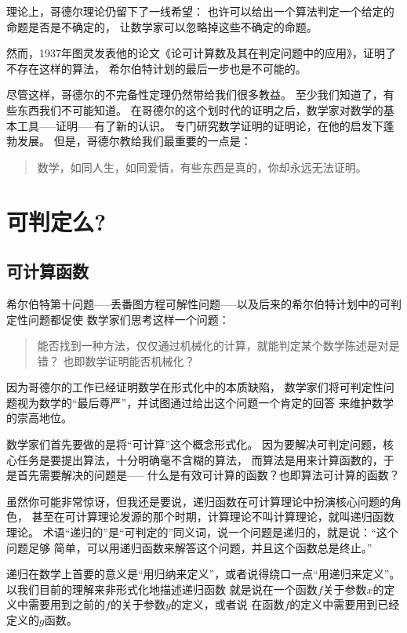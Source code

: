 \documentclass[12pt,a4paper,oneside]{ctexrep}
\theoremstyle{definition}
\begin{document}
理论上，哥德尔理论仍留下了一线希望：
也许可以给出一个算法判定一个给定的命题是否是不确定的，
让数学家可以忽略掉这些不确定的命题。

然而，1937年图灵发表他的论文《论可计算数及其在判定问题中的应用》，证明了不存在这样的算法，
希尔伯特计划的最后一步也是不可能的。

尽管这样，哥德尔的不完备性定理仍然带给我们很多教益。
至少我们知道了，有些东西我们不可能知道。
在哥德尔的这个划时代的证明之后，数学家对数学的基本工具-----证明-----有了新的认识。
专门研究数学证明的证明论，在他的启发下蓬勃发展。
但是，哥德尔教给我们最重要的一点是\cite{dream}：

\begin{quote}
数学，如同人生，如同爱情，有些东西是真的，你却永远无法证明。
\end{quote}

\section{可判定么?}

\subsection{可计算函数}

希尔伯特第十问题-----丢番图方程可解性问题-----以及后来的希尔伯特计划中的可判定性问题都促使
数学家们思考这样一个问题：

\begin{quote}
能否找到一种方法，仅仅通过机械化的计算，就能判定某个数学陈述是对是错？
也即数学证明能否机械化？
\end{quote}

因为哥德尔的工作已经证明数学在形式化中的本质缺陷，
数学家们将可判定性问题视为数学的“最后尊严”，并试图通过给出这个问题一个肯定的回答
来维护数学的崇高地位。

数学家们首先要做的是将“可计算”这个概念形式化。
因为要解决可判定问题，核心任务是要提出算法，十分明确毫不含糊的算法，
而算法是用来计算函数的，于是首先需要解决的问题是-----
什么是有效可计算的函数？也即算法可计算的函数？

虽然你可能非常惊讶，但我还是要说，递归函数在可计算理论中扮演核心问题的角色，
甚至在可计算理论发源的那个时期，计算理论不叫计算理论，就叫递归函数理论。
术语“递归的”是“可判定的”同义词，说一个问题是递归的，就是说：“这个问题足够
简单，可以用递归函数来解答这个问题，并且这个函数总是终止。”

递归在数学上首要的意义是“用归纳来定义”，或者说得绕口一点“用递归来定义”。
以我们目前的理解来非形式化地描述递归函数
就是说在一个函数$f$关于参数$x$的定义中需要用到之前的$f$的关于参数$y$的定义，或者说
在函数$f$的定义中需要用到已经定义的$g$函数。
\end{document}
